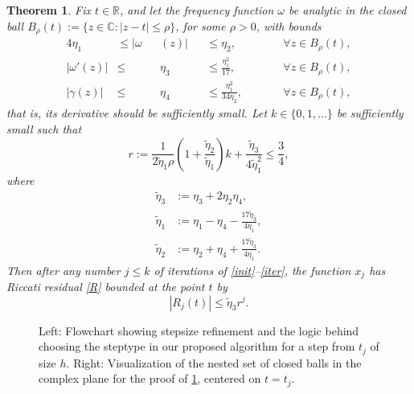 \documentclass[10pt]{article}
\newcommand{\be}{\begin{equation}}
\newcommand{\ee}{\end{equation}}
\newcommand{\C}{\mathbb{C}}
\newcommand{\R}{\mathbb{R}}
\newtheorem{thm}{Theorem}
\newcommand{\om}{\omega}
\newcommand{\g}{\gamma}
\newcommand{\te}{\tilde\eta}
\begin{document}
\begin{thm}\label{TR}
  Fix $t\in\R$, and let the frequency function $\om$ be analytic
  in the closed ball $B_\rho(t) := \{z\in\C : |z-t| \le \rho\}$,
  for some $\rho>0$, with bounds
    \begin{alignat}{4}
        \eta_1 &\leq |\om&&(z)| &&\leq \eta_2, \qquad &&\forall z\in B_\rho(t), \label{ommag} \\
        |\om'(z)| &\leq &&\eta_3 &&\leq \frac{\eta_1^2}{17}, &&\forall z\in B_\rho(t), \label{omder} \\
        |\g(z)| &\leq &&\eta_4 &&\leq \frac{\eta_1^2}{34\eta_2}, \qquad &&\forall z\in B_\rho(t), \label{gammaupper}
  \end{alignat}
  that is, its derivative should be sufficiently small.
  Let $k\in\{0,1,\dots\}$ be sufficiently small such that
  \be
    r := \frac{1}{2\te_1 \rho} \left(1 + \frac{\te_2}{\te_1}\right) k + \frac{\te_3}{4\te_1^2} \leq \frac{3}{4},
  \label{r}
  \ee
  where
  \begin{align}
    \te_3 &:= \eta_3 + 2\eta_2\eta_4, \label{eta3}
    \\
    \te_1 &:= \eta_1 - \eta_4 - \frac{17 \te_3}{4 \eta_1},  \label{eta1}
    \\ 
    \te_2 &:= \eta_2 + \eta_4 + \frac{17 \te_3}{4 \eta_1}. \label{eta2}
  \end{align}
  Then after any number $j\le k$ of iterations of \cref{init}--\cref{iter},
  the function $x_j$ has Riccati residual \cref{R} bounded at the point $t$ by
  \be
  |R_j(t)| \le \te_3 r^j.
  \label{Rjbnd}
  \ee
\end{thm}
%
\begin{figure}[tb]
    \centering
    \hfill
    \caption{\label{balls-flowchart} Left: Flowchart showing stepsize refinement and the logic
    behind choosing the steptype in our proposed algorithm for a step from
    $t_j$ of size $h$. Right: Visualization of the nested set of
    closed balls in the complex plane for the proof of \cref{TR}, centered on
    $t = t_j$.}
\end{figure}
\end{document}
